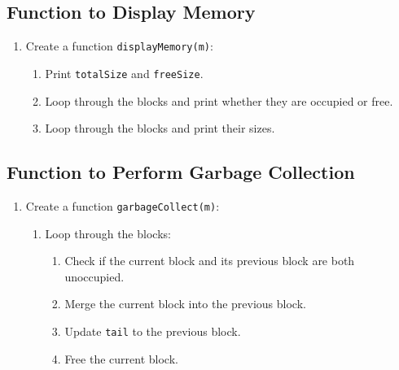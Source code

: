 \subsection{Function to Display Memory}
\begin{enumerate}[label=\arabic*.,left=0pt]
  \item Create a function \texttt{displayMemory(m)}:
        \begin{enumerate}[label=2.\arabic*.,left=0pt]
          \item Print \texttt{totalSize} and \texttt{freeSize}.
          \item Loop through the blocks and print whether they are occupied or free.
          \item Loop through the blocks and print their sizes.
        \end{enumerate}
\end{enumerate}

\subsection{Function to Perform Garbage Collection}
\begin{enumerate}[label=\arabic*.,left=0pt]
  \item Create a function \texttt{garbageCollect(m)}:
        \begin{enumerate}[label=2.\arabic*.,left=0pt]
          \item Loop through the blocks:
                \begin{enumerate}[label=2.2.\arabic*.,left=0pt]
                  \item Check if the current block and its previous block are both unoccupied.
                  \item Merge the current block into the previous block.
                  \item Update \texttt{tail} to the previous block.
                  \item Free the current block.
                \end{enumerate}
        \end{enumerate}
\end{enumerate}

